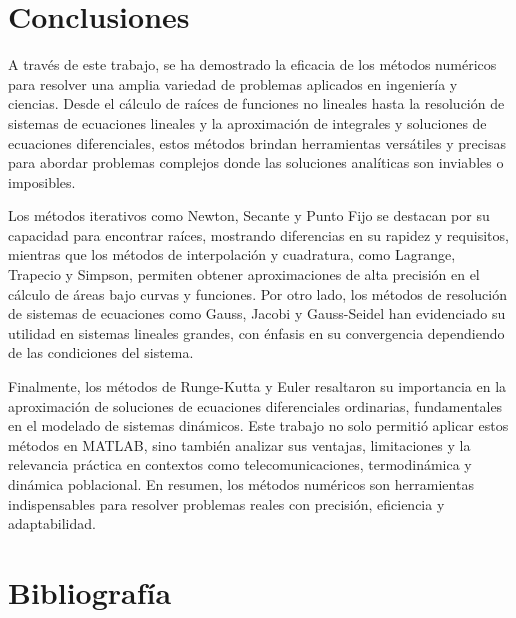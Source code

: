 \documentclass[12pt,a4paper,twoside]{article}  %
\begin{document}
\section{Conclusiones}

A través de este trabajo, se ha demostrado la eficacia de los métodos numéricos para resolver una amplia variedad de problemas aplicados en ingeniería y ciencias. Desde el cálculo de raíces de funciones no lineales hasta la resolución de sistemas de ecuaciones lineales y la aproximación de integrales y soluciones de ecuaciones diferenciales, estos métodos brindan herramientas versátiles y precisas para abordar problemas complejos donde las soluciones analíticas son inviables o imposibles.

Los métodos iterativos como Newton, Secante y Punto Fijo se destacan por su capacidad para encontrar raíces, mostrando diferencias en su rapidez y requisitos, mientras que los métodos de interpolación y cuadratura, como Lagrange, Trapecio y Simpson, permiten obtener aproximaciones de alta precisión en el cálculo de áreas bajo curvas y funciones. Por otro lado, los métodos de resolución de sistemas de ecuaciones como Gauss, Jacobi y Gauss-Seidel han evidenciado su utilidad en sistemas lineales grandes, con énfasis en su convergencia dependiendo de las condiciones del sistema.

Finalmente, los métodos de Runge-Kutta y Euler resaltaron su importancia en la aproximación de soluciones de ecuaciones diferenciales ordinarias, fundamentales en el modelado de sistemas dinámicos. Este trabajo no solo permitió aplicar estos métodos en MATLAB, sino también analizar sus ventajas, limitaciones y la relevancia práctica en contextos como telecomunicaciones, termodinámica y dinámica poblacional. En resumen, los métodos numéricos son herramientas indispensables para resolver problemas reales con precisión, eficiencia y adaptabilidad.

\newpage

\section{Bibliografía}
\end{document}
